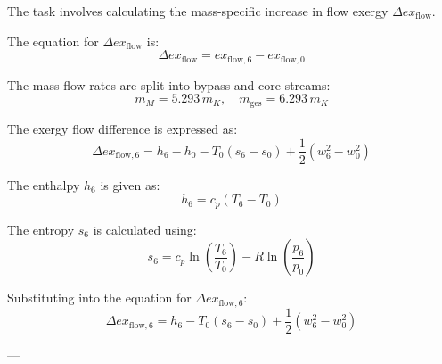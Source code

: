 The task involves calculating the mass-specific increase in flow exergy \( \Delta ex_{\text{flow}} \).  

The equation for \( \Delta ex_{\text{flow}} \) is:  
\[
\Delta ex_{\text{flow}} = ex_{\text{flow},6} - ex_{\text{flow},0}
\]  

The mass flow rates are split into bypass and core streams:  
\[
\dot{m}_M = 5.293 \, \dot{m}_K, \quad \dot{m}_{\text{ges}} = 6.293 \, \dot{m}_K
\]  

The exergy flow difference is expressed as:  
\[
\Delta ex_{\text{flow},6} = h_6 - h_0 - T_0 (s_6 - s_0) + \frac{1}{2}(w_6^2 - w_0^2)
\]  

The enthalpy \( h_6 \) is given as:  
\[
h_6 = c_p (T_6 - T_0)
\]  

The entropy \( s_6 \) is calculated using:  
\[
s_6 = c_p \ln \left( \frac{T_6}{T_0} \right) - R \ln \left( \frac{p_6}{p_0} \right)
\]  

Substituting into the equation for \( \Delta ex_{\text{flow},6} \):  
\[
\Delta ex_{\text{flow},6} = h_6 - T_0 (s_6 - s_0) + \frac{1}{2}(w_6^2 - w_0^2)
\]  

---